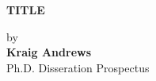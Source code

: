 \setcounter{page}{1}
\thispagestyle{empty}
\begin{titlepage}

	\begin{center}

	\singlespacing
	\textbf{TITLE}\\
	\doublespacing
	
	by\\
	
	\textbf{Kraig Andrews}\\
	Ph.D. Disseration Prospectus\\ 

	\end{center}

\end{titlepage}